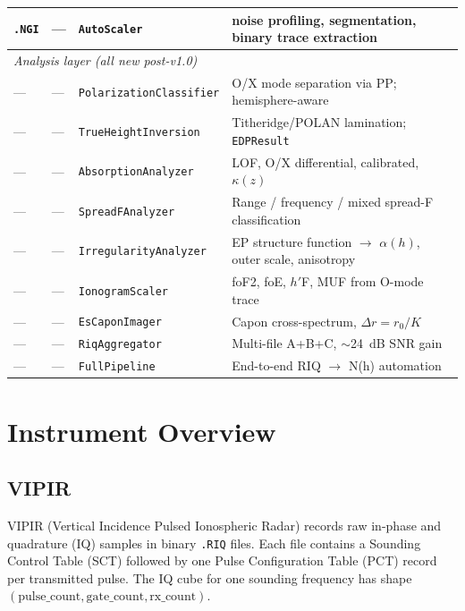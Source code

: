 \documentclass[a4paper,11pt]{article}
\begin{document}
\begin{table}[H]
\begin{tabular}{lllp{5cm}}
    \texttt{.NGI}     & —      & \texttt{AutoScaler}    & noise profiling, segmentation, binary trace extraction \\
    \midrule
    \multicolumn{4}{l}{\textit{Analysis layer (all new post-v1.0)}} \\
    —  & — & \texttt{PolarizationClassifier} & O/X mode separation via PP; hemisphere-aware \\
    —  & — & \texttt{TrueHeightInversion}    & Titheridge/POLAN lamination; \texttt{EDPResult} \\
    —  & — & \texttt{AbsorptionAnalyzer}     & LOF, O/X differential, calibrated, $\kappa(z)$ \\
    —  & — & \texttt{SpreadFAnalyzer}        & Range / frequency / mixed spread-F classification \\
    —  & — & \texttt{IrregularityAnalyzer}   & EP structure function $\to$ $\alpha(h)$, outer scale, anisotropy \\
    —  & — & \texttt{IonogramScaler}         & foF2, foE, $h'$F, MUF from O-mode trace \\
    —  & — & \texttt{EsCaponImager}          & Capon cross-spectrum, $\Delta r = r_0/K$ \\
    —  & — & \texttt{RiqAggregator}          & Multi-file A+B+C, $\sim$24~dB SNR gain \\
    —  & — & \texttt{FullPipeline}           & End-to-end RIQ $\to$ N(h) automation \\
    \bottomrule
  \end{tabular}
\end{table}

\section{Instrument Overview}
\label{sec:instruments}

\subsection{VIPIR}

VIPIR (Vertical Incidence Pulsed Ionospheric Radar) records raw in-phase and
quadrature (IQ) samples in binary \texttt{.RIQ} files.  Each file contains a
Sounding Control Table (SCT) followed by one Pulse Configuration Table (PCT)
record per transmitted pulse.  The IQ cube for one sounding frequency has shape
$(\text{pulse\_count}, \text{gate\_count}, \text{rx\_count})$.
\end{document}
